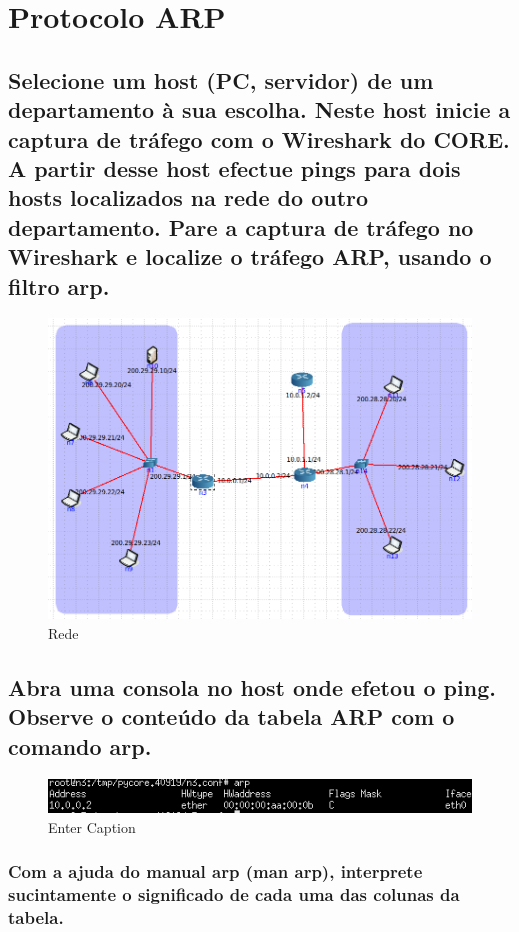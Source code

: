 \section{Protocolo ARP}
\subsection*{Selecione um host (PC, servidor) de um departamento à sua escolha. Neste host inicie a
captura de tráfego com o Wireshark do CORE. A partir desse host efectue pings para dois
hosts localizados na rede do outro departamento. Pare a captura de tráfego no
Wireshark e localize o tráfego ARP, usando o filtro arp.}

\begin{figure} [h]
    \centering
    \includegraphics[width=0.8\linewidth]{ligacoes-routers.png}
    \caption{Rede}
    \label{fig:enter-label}
\end{figure}

\subsection{Abra uma consola no host onde efetou o ping. Observe o conteúdo da tabela ARP com o comando arp.}

\begin{figure} [h]
    \centering
    \includegraphics[width=1\linewidth]{dois-pings-tabela-arp.png}
    \caption{Enter Caption}
    \label{fig:enter-label}
\end{figure}

\subsubsection{Com a ajuda do manual arp (man arp), interprete sucintamente o significado de cada uma das colunas da tabela.}


